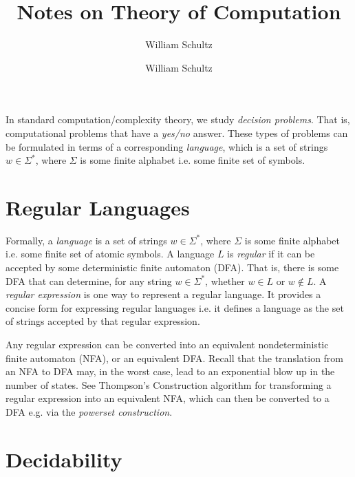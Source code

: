 \documentclass[10pt,a4paper]{article}
\author{William Schultz}
\begin{document}
\title{Notes on Theory of Computation}
\author{William Schultz}
\maketitle

In standard computation/complexity theory, we study \textit{decision problems}. That is, computational problems that have a \textit{yes/no} answer. These types of problems can be formulated in terms of a corresponding \textit{language}, which is a set of strings $w \in \Sigma^*$, where $\Sigma$ is some finite alphabet i.e. some finite set of symbols.

\section{Regular Languages}


Formally, a \textit{language} is a set of strings $w \in \Sigma^*$, where $\Sigma$ is some finite alphabet i.e. some finite set of atomic symbols.
A language $L$ is \textit{regular} if it can be accepted by some deterministic finite automaton (DFA). That is, there is some DFA that can determine, for any string $w \in \Sigma^*$, whether $w \in L$ or $w \notin L$. A \textit{regular expression} is one way to represent a regular language. It provides a concise form for expressing regular languages i.e. it defines a language as the set of strings accepted by that regular expression. 

Any regular expression can be converted into an equivalent nondeterministic finite automaton (NFA), or an equivalent DFA. Recall that the translation from an NFA to DFA may, in the worst case, lead to an exponential blow up in the number of states. See Thompson's Construction algorithm for transforming a regular expression into an equivalent NFA, which can then be converted to a DFA e.g. via the \textit{powerset construction}.

\section{Decidability}
\end{document}
